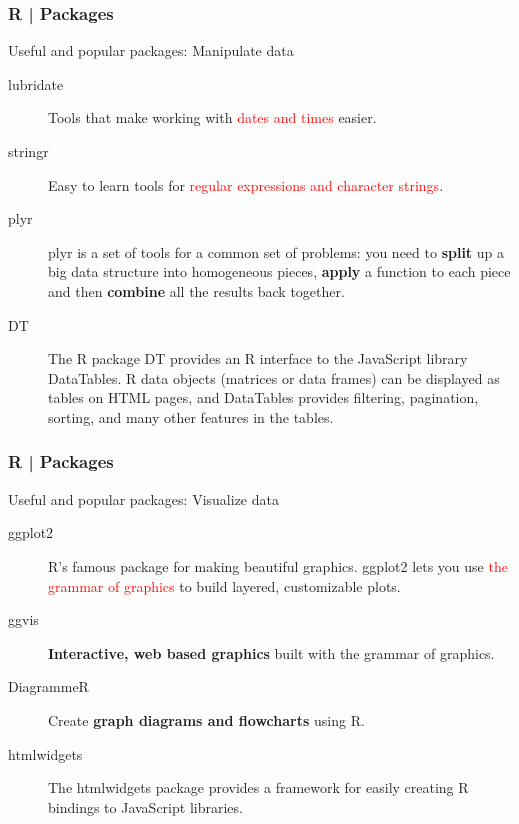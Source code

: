 \begin{frame}[fragile]
  \frametitle{R | Packages}
  \begin{block}{Useful and popular packages: Manipulate data}
    \begin{description}
      \item[\alert{lubridate}] Tools that make working with \textcolor{red}{dates and times} easier.
      \item[\alert{stringr}] Easy to learn tools for \textcolor{red}{regular expressions and character strings}.
      \item[plyr] plyr is a set of tools for a common set of problems: you need to \textbf{split} up a big data structure into homogeneous pieces, \textbf{apply} a function to each piece and then \textbf{combine} all the results back together.
      \item[DT] The R package DT provides an R interface to the JavaScript library DataTables. R data objects (matrices or data frames) can be displayed as tables on HTML pages, and DataTables provides filtering, pagination, sorting, and many other features in the tables.
    \end{description}
  \end{block}
\end{frame}

\begin{frame}
  \frametitle{R | Packages}
  \begin{block}{Useful and popular packages: Visualize data}
    \begin{description}
      \item[\alert{ggplot2}] R's famous package for making beautiful graphics. ggplot2 lets you use \textcolor{red}{the grammar of graphics} to build layered, customizable plots.
      \item[ggvis] \textbf{Interactive, web based graphics} built with the grammar of graphics.
      \item[DiagrammeR] Create \textbf{graph diagrams and flowcharts} using R.
      \item[htmlwidgets] The htmlwidgets package provides a framework for easily creating R bindings to JavaScript libraries.
    \end{description}
  \end{block}
\end{frame}

